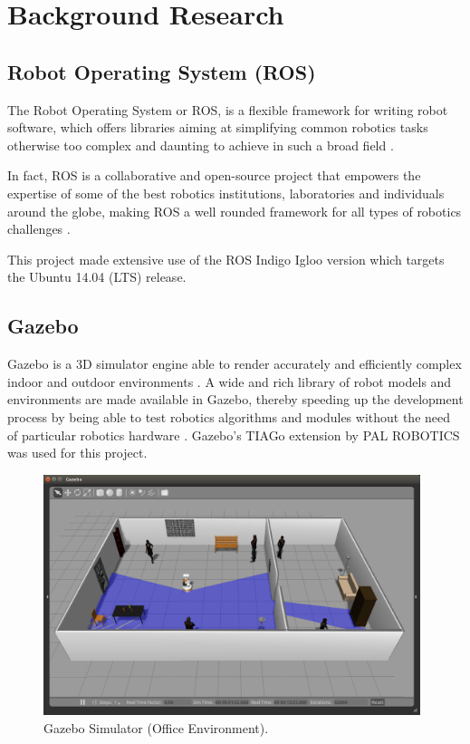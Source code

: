 \chapter{Background Research}
\label{chapter2}

\section{Robot Operating System (ROS)}

The Robot Operating System or ROS, is a flexible framework for writing robot software, which offers libraries aiming at simplifying common robotics tasks otherwise too complex and daunting to achieve in such a broad field \cite{website:aboutROS}. 

In fact, ROS is a collaborative and open-source project that empowers the expertise of some of the best robotics institutions, laboratories and individuals around the globe, making ROS a well rounded framework for all types of robotics challenges \cite{website:aboutROS}. 

This project made extensive use of the ROS Indigo Igloo version which targets the Ubuntu 14.04 (LTS) release.

\section{Gazebo}

Gazebo is a 3D simulator engine able to render accurately and efficiently complex indoor and outdoor environments \cite{website:Gazebo}. A wide and rich library of robot models and environments are made available in Gazebo, thereby speeding up the development process by being able to test robotics algorithms and modules without the need of particular robotics hardware \cite{website:Gazebo}. Gazebo's TIAGo extension by PAL ROBOTICS was used for this project.

\begin{figure}[H]
\begin{center}
\includegraphics[width=11cm]{images/chapter2_gazebo_screenshot.png}
\end{center}
\caption{Gazebo Simulator (Office Environment).}
\label{fig:gazebo_screenshot}
\end{figure}


